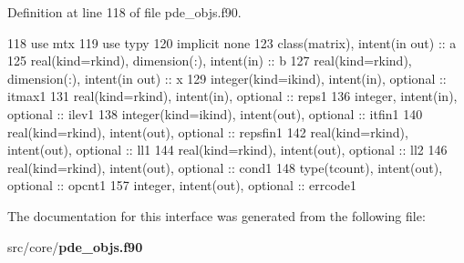 Definition at line 118 of file pde\+\_\+objs.\+f90.


\begin{DoxyCode}
118         \textcolor{keywordtype}{use }mtx
119         \textcolor{keywordtype}{use }typy
120         \textcolor{keywordtype}{implicit none}
123         \textcolor{keywordtype}{class}(matrix), \textcolor{keywordtype}{intent(in out)} :: a
125         \textcolor{keywordtype}{real(kind=rkind)}, \textcolor{keywordtype}{dimension(:)}, \textcolor{keywordtype}{intent(in)} :: b
127         \textcolor{keywordtype}{real(kind=rkind)}, \textcolor{keywordtype}{dimension(:)}, \textcolor{keywordtype}{intent(in out)} :: x
129         \textcolor{keywordtype}{integer(kind=ikind)}, \textcolor{keywordtype}{intent(in)}, \textcolor{keywordtype}{optional} :: itmax1
131         \textcolor{keywordtype}{real(kind=rkind)}, \textcolor{keywordtype}{intent(in)}, \textcolor{keywordtype}{optional} :: reps1
136         \textcolor{keywordtype}{integer}, \textcolor{keywordtype}{intent(in)}, \textcolor{keywordtype}{optional} :: ilev1
138         \textcolor{keywordtype}{integer(kind=ikind)}, \textcolor{keywordtype}{intent(out)}, \textcolor{keywordtype}{optional} :: itfin1
140         \textcolor{keywordtype}{real(kind=rkind)}, \textcolor{keywordtype}{intent(out)}, \textcolor{keywordtype}{optional} :: repsfin1
142         \textcolor{keywordtype}{real(kind=rkind)}, \textcolor{keywordtype}{intent(out)}, \textcolor{keywordtype}{optional} :: ll1
144         \textcolor{keywordtype}{real(kind=rkind)}, \textcolor{keywordtype}{intent(out)}, \textcolor{keywordtype}{optional} :: ll2
146         \textcolor{keywordtype}{real(kind=rkind)}, \textcolor{keywordtype}{intent(out)}, \textcolor{keywordtype}{optional} :: cond1
148         \textcolor{keywordtype}{type}(tcount), \textcolor{keywordtype}{intent(out)}, \textcolor{keywordtype}{optional} :: opcnt1
157         \textcolor{keywordtype}{integer}, \textcolor{keywordtype}{intent(out)}, \textcolor{keywordtype}{optional} :: errcode1
\end{DoxyCode}


The documentation for this interface was generated from the following file\+:\begin{DoxyCompactItemize}
\item 
src/core/{\bf pde\+\_\+objs.\+f90}\end{DoxyCompactItemize}
